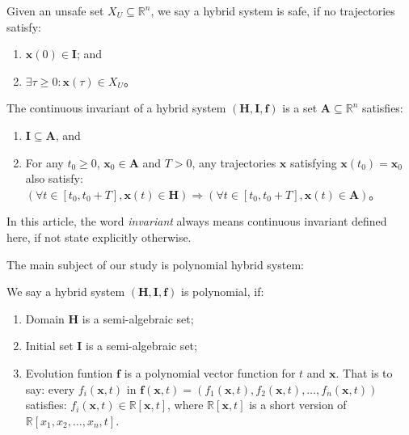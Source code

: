 \documentclass{jssc}
\begin{document}
\begin{definition}[Safety]
Given an unsafe set $X_U \subseteq \mathbb{R}^n$,  we say a hybrid system is safe, if no trajectories satisfy: 
	\begin{enumerate}
		\item $\boldsymbol{x}(0) \in \boldsymbol{I}$; and
		\item $\exists \tau \geq 0 : \boldsymbol{x}(\tau) \in X_U$。
	\end{enumerate}
\end{definition}

\begin{definition}
\label{def:invariant}
The continuous invariant of a hybrid system $(\boldsymbol{H}, \boldsymbol{I}, \boldsymbol{f})$ is a set $\boldsymbol{A} \subseteq \mathbb{R}^n$ satisfies:
	\begin{enumerate}
		\item $\boldsymbol{I} \subseteq \boldsymbol{A}$, and 
		\item For any $t_0 \geq 0$, $\boldsymbol{x}_0 \in \boldsymbol{A}$ and $T > 0$, any trajectories $\boldsymbol{x}$ satisfying $\boldsymbol{x}(t_0) = \boldsymbol{x}_0$ also satisfy: $(\forall t \in [t_0, t_0 + T],\boldsymbol{x}(t) \in \boldsymbol{H}) \Rightarrow (\forall t \in [t_0,t_0 + T], \boldsymbol{x}(t) \in \boldsymbol{A})$。
	\end{enumerate}
\end{definition}

In this article, the word \emph{invariant} always means continuous invariant defined here, if not state explicitly otherwise.

The main subject of our study is polynomial hybrid system: 
\begin{definition}
	We say a hybrid system $(\boldsymbol{H}, \boldsymbol{I}, \boldsymbol{f})$ is polynomial, if: 
	\begin{enumerate}
		\item Domain $\boldsymbol{H}$ is a semi-algebraic set;
		\item Initial set $\boldsymbol{I}$ is a semi-algebraic set;
		\item Evolution funtion $\boldsymbol{f}$ is a polynomial vector function for $t$ and $\boldsymbol{x}$. That is to say: every $f_i(\boldsymbol{x}, t)$ in $\boldsymbol{f}(\boldsymbol{x}, t) = (f_1(\boldsymbol{x}, t), f_2(\boldsymbol{x}, t), \dots, f_n(\boldsymbol{x}, t))$ satisfies: $f_i(\boldsymbol{x}, t) \in \mathbb{R}[\boldsymbol{x}, t]$, where $\mathbb{R}[\boldsymbol{x}, t]$ is a short version of $\mathbb{R}[x_1, x_2, \dots, x_n, t]$.
	\end{enumerate}
\end{definition}
\end{document}
